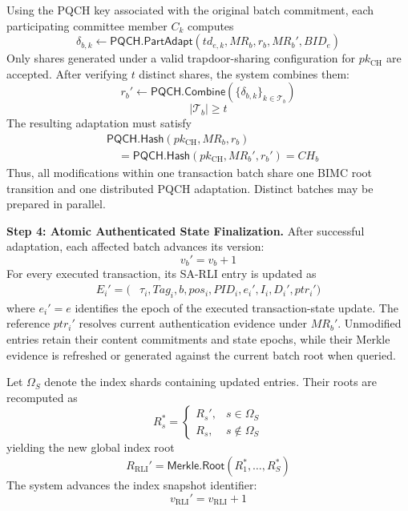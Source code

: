 \documentclass[lettersize,journal]{IEEEtran}
\begin{document}
Using the PQCH key associated with the
original batch commitment, each participating
committee member $C_k$ computes
\begin{equation}
\delta_{b,k}\leftarrow
\mathsf{PQCH.PartAdapt}
(td_{e,k},MR_b,r_b,MR_b',BID_e)
\end{equation}
Only shares generated under a valid
trapdoor-sharing configuration for
$pk_{\mathrm{CH}}$ are accepted. After
verifying $t$ distinct shares, the system
combines them:
\begin{equation}
r_b'\leftarrow
\mathsf{PQCH.Combine}
(\{\delta_{b,k}\}_{k\in\mathcal{T}_b})
\end{equation}
\begin{equation}
|\mathcal{T}_b|\geq t
\end{equation}
The resulting adaptation must satisfy
\begin{equation}
\begin{aligned}
&\mathsf{PQCH.Hash}
(pk_{\mathrm{CH}},MR_b,r_b)\\
&\quad=
\mathsf{PQCH.Hash}
(pk_{\mathrm{CH}},MR_b',r_b')
=CH_b
\end{aligned}
\end{equation}
Thus, all modifications within one
transaction batch share one BIMC root
transition and one distributed PQCH
adaptation. Distinct batches may be
prepared in parallel.

\medskip
\noindent\textbf{Step 4: Atomic Authenticated
State Finalization.}
After successful adaptation, each affected
batch advances its version:
\begin{equation}
v_b'=v_b+1
\end{equation}
For every executed transaction, its SA-RLI
entry is updated as
\begin{equation}
\begin{aligned}
E_i'=\big(&\tau_i,Tag_i,b,pos_i,PID_i,e_i',I_i,D_i',ptr_i'\big)
\end{aligned}
\end{equation}
where $e_i'=e$ identifies the epoch of
the executed transaction-state update.
The reference $ptr_i'$ resolves current
authentication evidence under $MR_b'$.
Unmodified entries retain their content
commitments and state epochs, while their
Merkle evidence is refreshed or generated
against the current batch root when queried.

Let $\Omega_S$ denote the index shards
containing updated entries. Their roots
are recomputed as
\begin{equation}
R_s^{*}=
\begin{cases}
R_s',&s\in\Omega_S\\
R_s,&s\notin\Omega_S
\end{cases}
\end{equation}
yielding the new global index root
\begin{equation}
R_{\mathrm{RLI}}'=
\mathsf{Merkle.Root}
(R_1^{*},\ldots,R_S^{*})
\end{equation}
The system advances the index snapshot
identifier:
\begin{equation}
v_{\mathrm{RLI}}'
=v_{\mathrm{RLI}}+1
\end{equation}
\end{document}
